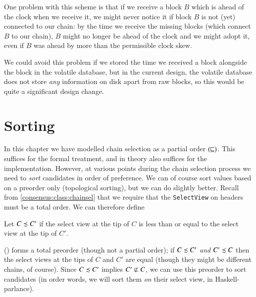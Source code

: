 \begin{bug}
One problem with this scheme is that if we receive a block $B$ which is ahead of
the clock when we receive it, we might never notice it if block $B$ is not (yet)
connected to our chain: by the time we receive the missing blocks (which connect
$B$ to our chain), $B$ might no longer be ahead of the clock and we might adopt
it, even if $B$ was ahead by more than the permissible clock skew.

We could avoid this problem if we stored the time we received a block alongside
the block in the volatile database, but in the current design, the volatile
database does not store \emph{any} information on disk apart from raw blocks,
so this would be quite a significant design change.
\end{bug}

\section{Sorting}

In this chapter we have modelled chain selection as a partial order
$(\mathrel{\sqsubseteq})$. This suffices for the formal treatment, and in theory also
suffices for the implementation. However, at various points during the chain
selection process we need to \emph{sort} candidates in order of preference. We
can of course sort values based on a preorder only (topological sorting), but we
can do slightly better. Recall from \cref{consensus:class:chainsel} that we
require that the \lstinline!SelectView! on headers must be a total order. We can
therefore define

\begin{definition}
Let $C \precsim C'$ if the select view at the tip of $C$ is less than
or equal to the select view at the tip of $C'$.
\end{definition}

(\selectviewle) forms a total preorder (though not a partial order); if $C
\precsim C'$ \emph{and} $C' \precsim C$ then the select views at the
tips of $C$ and $C'$ are equal (though they might be different chains, of
course). Since $C \precsim C'$ implies $C' \chainnotlt C$, we can use this
preorder  to sort candidates (in order words, we will sort them \emph{on} their
select view, in Haskell-parlance).
